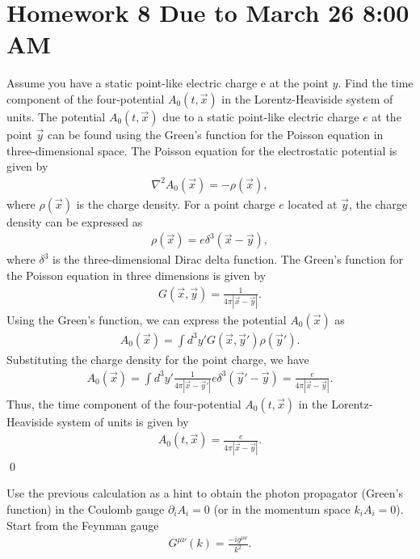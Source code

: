 \section*{Homework 8 Due to March 26 8:00 AM}

Assume you have a static point-like electric charge e at the point $y$. Find the time component of the four-potential $A_0(t,\vec{x})$ in the Lorentz-Heaviside system of units.
\answer{}
The potential $A_0(t,\vec{x})$ due to a static point-like electric charge $e$ at the point $\vec{y}$ can be found using the Green's function for the Poisson equation in three-dimensional space. The Poisson equation for the electrostatic potential is given by
\begin{align}
    \nabla^2 A_0(\vec{x}) = -\rho(\vec{x}),
\end{align}
where $\rho(\vec{x})$ is the charge density. For a point charge $e$ located at $\vec{y}$, the charge density can be expressed as
\begin{align}
    \rho(\vec{x}) = e \delta^3(\vec{x} - \vec{y}),
\end{align} where $\delta^3$ is the three-dimensional Dirac delta function. The Green's function for the Poisson equation in three dimensions is given by
\begin{align}
    G(\vec{x}, \vec{y}) = \frac{1}{4\pi |\vec{x} - \vec{y}|}.
\end{align}
Using the Green's function, we can express the potential $A_0(\vec{x})$ as
\begin{align}
    A_0(\vec{x}) = \int d^3y' G(\vec{x}, \vec{y}') \rho(\vec{y}').
\end{align}
Substituting the charge density for the point charge, we have
\begin{align}
    A_0(\vec{x}) = \int d^3y' \frac{1}{4\pi |\vec{x} - \vec{y}'|} e \delta^3(\vec{y}' - \vec{y}) = \frac{e}{4\pi |\vec{x} - \vec{y}|}.
\end{align}
Thus, the time component of the four-potential $A_0(t,\vec{x})$ in the Lorentz-Heaviside system of units is given by
\begin{align}
    A_0(t,\vec{x}) = \frac{e}{4\pi |\vec{x} - \vec{y}|}.
\end{align} 
\qed




\clearpage
{}
Use the previous calculation as a hint to obtain the photon propagator (Green’s function) in the Coulomb gauge $\partial_i A_i = 0$ (or in the momentum space $k_i A_i = 0$). Start from the Feynman gauge
\begin{align}
    G^{\mu\nu}(k) = \frac{-ig^{\mu\nu}}{k^2 }.
\end{align}


